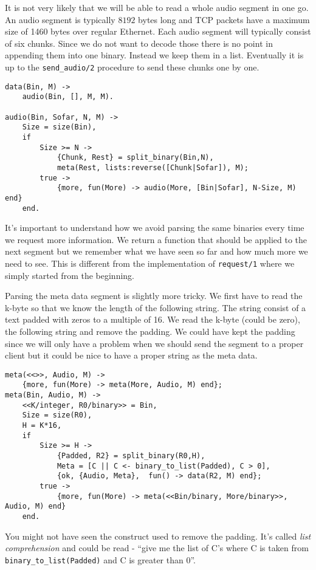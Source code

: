 \documentclass[a4paper,11pt]{article}
\begin{document}
It is not very likely that we will be able to read a whole audio
segment in one go. An audio segment is typically $8192$ bytes long and
TCP packets have a maximum size of 1460 bytes over regular
Ethernet. Each audio segment will typically consist of six
chunks. Since we do not want to decode those there is no point in
appending them into one binary. Instead we keep them in a
list. Eventually it is up to the {\tt send\_audio/2} procedure to send
these chunks one by one.

\begin{verbatim}
data(Bin, M) ->
    audio(Bin, [], M, M).

audio(Bin, Sofar, N, M) ->
    Size = size(Bin),
    if 
        Size >= N ->
            {Chunk, Rest} = split_binary(Bin,N),
            meta(Rest, lists:reverse([Chunk|Sofar]), M);
        true ->
            {more, fun(More) -> audio(More, [Bin|Sofar], N-Size, M) end}
    end.
\end{verbatim}

It's important to understand how we avoid parsing the same binaries
every time we request more information. We return a function that
should be applied to the next segment but we remember what we have
seen so far and how much more we need to see. This is different from
the implementation of {\tt request/1} where we simply started from the
beginning.

Parsing the meta data segment is slightly more tricky. We first have
to read the k-byte so that we know the length of the following
string. The string consist of a text padded with zeros to a multiple
of 16. We read the k-byte (could be zero), the following string and
remove the padding. We could have kept the padding since we will only
have a problem when we should send the segment to a proper client but
it could be nice to have a proper string as the meta data. 

\begin{verbatim}
meta(<<>>, Audio, M) ->
    {more, fun(More) -> meta(More, Audio, M) end};
meta(Bin, Audio, M) ->    
    <<K/integer, R0/binary>> = Bin,
    Size = size(R0),
    H = K*16,
    if
        Size >= H ->
            {Padded, R2} = split_binary(R0,H),
            Meta = [C || C <- binary_to_list(Padded), C > 0],
            {ok, {Audio, Meta},  fun() -> data(R2, M) end};
        true ->
            {more, fun(More) -> meta(<<Bin/binary, More/binary>>, Audio, M) end}
    end.
\end{verbatim}

You might not have seen the construct used to remove the padding. It's
called {\em list comprehension} and could be read - ``give me the list
of C's where C is taken from {\tt binary\_to\_list(Padded)} and C is greater
than 0''. 
\end{document}
